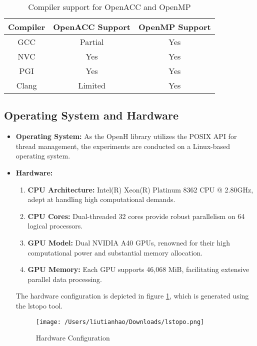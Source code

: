 \documentclass[13pt]{article}
\begin{document}
\begin{table}[ht]
    \centering
    \begin{tabular}{|c|c|c|}
    \hline
    \textbf{Compiler} & \textbf{OpenACC Support} & \textbf{OpenMP Support} \\
    \hline
    GCC & Partial & Yes \\ \hline
    NVC & Yes & Yes \\ \hline
    PGI & Yes & Yes \\ \hline
    Clang & Limited & Yes \\ \hline
    \end{tabular}
    \caption{Compiler support for OpenACC and OpenMP}
    \label{tab:compiler_support}
\end{table}

\subsection{Operating System and Hardware}

\begin{itemize}
    \item \textbf{Operating System:}
    As the OpenH library utilizes the POSIX API for thread management, the experiments are conducted on a Linux-based operating system.

    \item \textbf{Hardware:}
    \begin{enumerate}
        \item \textbf{CPU Architecture:} Intel(R) Xeon(R) Platinum 8362 CPU @ 2.80GHz, adept at handling high computational demands.
        
        \item \textbf{CPU Cores:} Dual-threaded 32 cores provide robust parallelism on 64 logical processors.
        
        \item \textbf{GPU Model:} Dual NVIDIA A40 GPUs, renowned for their high computational power and substantial memory allocation.
        
        \item \textbf{GPU Memory:} Each GPU supports 46,068 MiB, facilitating extensive parallel data processing. 
    \end{enumerate}
    The hardware configuration is depicted in figure \ref{fig:hardware}, which is generated using the lstopo tool.

    \begin{figure}[ht]
        \centering
        \texttt{[image: /Users/liutianhao/Downloads/lstopo.png]}
        \caption{Hardware Configuration}
        \label{fig:hardware}
    \end{figure}

\end{itemize}
\end{document}
